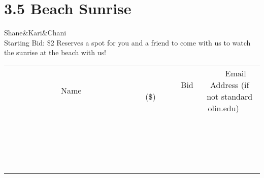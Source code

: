 \documentclass[11pt]{article}
\begin{document}
\section*{3.5 Beach Sunrise}
Shane\&Kari\&Chani
\\
Starting Bid: \$2
\newline
Reserves a spot for you and a friend to come with us to watch the sunrise at the beach with us!
\\[3ex]
\begin{tabular}{c c c}
~~~~~~~~~~~~~Name~~~~~~~~~~~~~ & ~~~~~~~~~Bid (\$)~~~~~~~~~  & ~~~Email Address (if not standard olin.edu)~~~\\
 & & \\
\hline
 & & \\
\hline
 & & \\
\hline
 & & \\
\hline
 & & \\
\hline
 & & \\
\hline
 & & \\
\hline
 & & \\
\hline
 & & \\
\hline
 & & \\
\hline
 & & \\
\hline
 & & \\
\hline
 & & \\
\hline
 & & \\
\hline
 & & \\
\hline
 & & \\
\hline
 & & \\
\hline
 & & \\
\hline
 & & \\
\hline
\end{tabular}
\newpage
\end{document}
